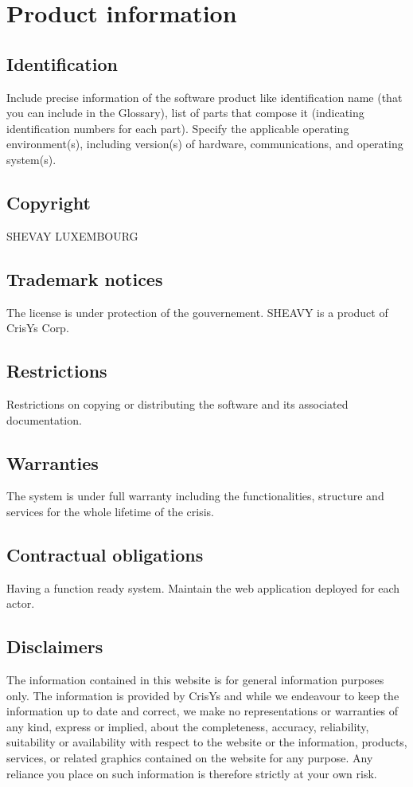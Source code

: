 \chapter{Product information}
\vspace{-6em}


\section{Identification}
Include precise information of the software product like identification name (that you 
can include in the \gls{Glossary}), list of parts that compose it (indicating identification
numbers for each part). 
Specify the applicable operating environment(s), including version(s) of hardware, communications,
and operating system(s).



\section{Copyright}
SHEVAY LUXEMBOURG 

\section{Trademark notices}
The license is under protection of the gouvernement. SHEAVY is a product of
CrisYs Corp.

\section{Restrictions}
Restrictions on copying or distributing the software and its associated
documentation.

\section{Warranties}
The system is under full warranty including the functionalities, structure and
services for the whole lifetime of the crisis.

\section{Contractual obligations}
Having a function ready system. Maintain the web application deployed for each
actor.

\section{Disclaimers}
The information contained in this website is for general information purposes
only. The information is provided by CrisYs and while we endeavour to keep the
information up to date and correct, we make no representations or warranties of 
any kind, express or implied, about the completeness, accuracy, reliability, 
suitability or availability with respect to the website or the information, 
products, services, or related graphics contained on the website for any purpose. 
Any reliance you place on such information is therefore strictly at your own risk.

